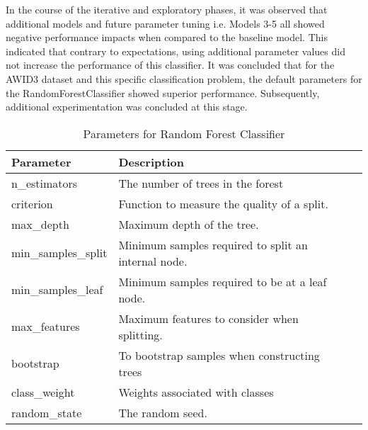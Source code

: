 In the course of the iterative and exploratory phases, it was observed that additional models and future parameter tuning i.e. Models 3-5 all showed negative performance impacts when compared to the baseline model. This indicated that contrary to expectations, using additional parameter values did not increase the performance of this classifier. It was concluded that for the AWID3 dataset and this specific classification problem, the default parameters for the RandomForestClassifier showed superior performance. Subsequently, additional experimentation was concluded at this stage. 

\begin{table}[h]
\centering
\caption{Parameters for Random Forest Classifier}
\label{tab:rf-params}
\begin{tabular}{|l|l|l|}
\hline
\textbf{Parameter} & \textbf{Description} \\ \hline
n\_estimators & The number of trees in the forest\\
criterion & Function to measure the quality of a split.\\
max\_depth & Maximum depth of the tree. \\
min\_samples\_split & Minimum samples required to split an internal node. \\ 
min\_samples\_leaf & Minimum samples required to be at a leaf node. \\
max\_features & Maximum features to consider when splitting. \\
bootstrap & To bootstrap samples when constructing trees \\
class\_weight & Weights associated with classes \\
random\_state & The random seed.\\ \hline
\end{tabular}
\end{table}


